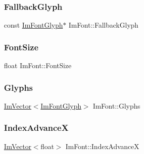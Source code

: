 \hypertarget{struct_im_font_a0e666b0c49646bd294103f4d288df4b8}{}\label{struct_im_font_a0e666b0c49646bd294103f4d288df4b8} 
\subsubsection{\texorpdfstring{Fallback\+Glyph}{FallbackGlyph}}
{\footnotesize\ttfamily const \hyperlink{struct_im_font_glyph}{Im\+Font\+Glyph}$\ast$ Im\+Font\+::\+Fallback\+Glyph}

\hypertarget{struct_im_font_a423e36d1594281f1a5a537e5b0d0a3d4}{}\label{struct_im_font_a423e36d1594281f1a5a537e5b0d0a3d4} 
\subsubsection{\texorpdfstring{Font\+Size}{FontSize}}
{\footnotesize\ttfamily float Im\+Font\+::\+Font\+Size}

\hypertarget{struct_im_font_a1a0901fc1a8cbd41d582d6cef4946bc9}{}\label{struct_im_font_a1a0901fc1a8cbd41d582d6cef4946bc9} 
\subsubsection{\texorpdfstring{Glyphs}{Glyphs}}
{\footnotesize\ttfamily \hyperlink{class_im_vector}{Im\+Vector}$<$\hyperlink{struct_im_font_glyph}{Im\+Font\+Glyph}$>$ Im\+Font\+::\+Glyphs}

\hypertarget{struct_im_font_af906476eda06d8a842d0a843a247f530}{}\label{struct_im_font_af906476eda06d8a842d0a843a247f530} 
\subsubsection{\texorpdfstring{Index\+AdvanceX}{IndexAdvanceX}}
{\footnotesize\ttfamily \hyperlink{class_im_vector}{Im\+Vector}$<$float$>$ Im\+Font\+::\+Index\+AdvanceX}

\hypertarget{struct_im_font_aaab48cbf05ca962d71ab3e7b597b992f}{}\label{struct_im_font_aaab48cbf05ca962d71ab3e7b597b992f} 

